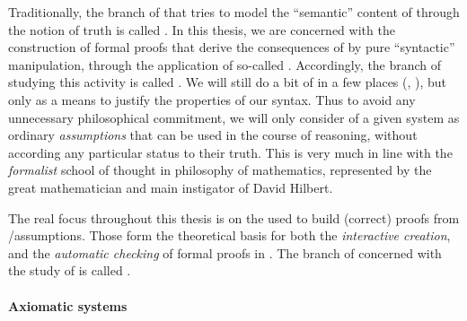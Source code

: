 \AP
Traditionally, the branch of  that tries to model the
``semantic'' content of  through the notion of truth is called
. In this thesis, we are concerned with the construction of
formal proofs that derive the consequences of  by pure ``syntactic''
manipulation, through the application of so-called .
Accordingly, the branch of  studying this activity is
called . We will still do a bit of  in a few
places (, ), but only as a means
to justify the properties of our syntax. Thus to avoid any unnecessary
philosophical commitment, we will only consider  of a given system as
ordinary \emph{assumptions} that can be used in the course of reasoning, without
according any particular status to their truth. This is very much in line with
the \emph{formalist} school of thought in philosophy of mathematics, represented
by the great mathematician and main instigator of  David Hilbert.

\begin{emphpar}
\AP The real focus throughout this thesis is on the \emph{}
used to build (correct) proofs from /assumptions. Those form the
theoretical basis for both the \emph{interactive creation}, and the
\emph{automatic checking} of formal proofs in . The branch
of  concerned with the study of  is called
.
\end{emphpar}

\paragraph{Axiomatic systems} 

